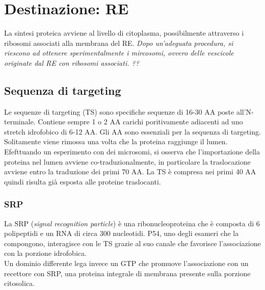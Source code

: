 \section{Destinazione: RE}
    La sintesi proteica avviene al livello di citoplasma, possibilmente attraverso i ribosomi associati alla membrana del RE. 
    \textit{Dopo un'adeguata procedura, si riescono ad ottenere sperimentalmente i mircosomi, ovvero delle vescicole originate dal RE con ribosomi associati. ?? }
    
    \subsection{Sequenza di targeting}
            Le sequenze di targeting (TS) sono specifiche sequenze di 16-30 AA poste all'N-terminale. Contiene sempre 1 o 2 AA carichi poritivamente adiacenti ad uno stretch idrofobico di 6-12 AA. Gli AA sono essenziali per la sequenza di targeting.
            Solitamente viene rimossa una volta che la proteina raggiunge il lumen. \\
            Efefttuando un esperimento con dei microsomi, si osserva che l'importazione della proteina nel lumen avviene co-traduzionalmente, in particolare la traslocazione avviene entro la traduzione dei primi 70 AA. La TS è compresa nei primi 40 AA quindi risulta già esposta alle proteine traslocanti.\\
            
            \subsubsection{SRP}
                La SRP (\textit{signal recognition particle}) è una ribonucleoproteina che è composta di 6 polipeptidi e un RNA di circa 300 nucleotidi. P54, uno degli esameri che la compongono, interagisce con le TS grazie al suo canale che favorisce l'associazione con la porzione idrofobica.\\
                Un dominio differente lega invece un GTP che promuove l'associazione con un recettore con SRP, una proteina integrale di membrana presente sulla porzione citosolica.
            
